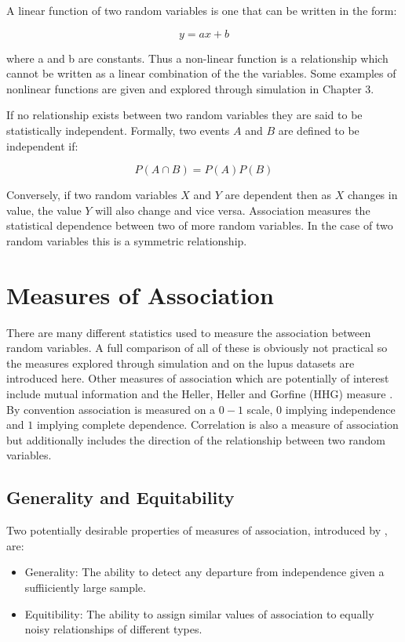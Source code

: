 \documentclass[a4paper, 12pt]{report}
\begin{document}
A linear function of two random variables is one that can be written in the form:

\[
y = ax + b
\]

where a and b are constants. Thus a non-linear function is a relationship which cannot be written as a linear combination of the the variables. Some examples of nonlinear functions are given and explored through simulation in Chapter 3.

If no relationship exists between two random variables they are said to be statistically independent. Formally, two events $A$ and $B$ are defined to be independent if:

\[
P(A \cap B) = P(A)P(B)
\]
 
Conversely, if two random variables $X$ and $Y$ are dependent then as $X$ changes in value, the value $Y$ will also change and vice versa. Association measures the statistical dependence between two of more random variables. In the case of two random variables this is a symmetric relationship.

\section{Measures of \gls{Association} }
There are many different statistics used to measure the association between random variables. A full comparison of all of these is obviously not practical so the measures explored through simulation and on the lupus datasets are introduced here. Other measures of association which are potentially of interest include mutual information and the Heller, Heller and Gorfine (HHG) measure \cite{HHG}. By convention association is measured on a $0-1$ scale, $0$ implying independence and $1$ implying complete dependence. \gls{Correlation} is also a measure of association but additionally includes the direction of the relationship between two random variables.

\subsection*{Generality and Equitability}
Two potentially desirable properties of measures of association, introduced by \citet{mic2011}, are:

\begin{itemize}
\item \gls{Generality}: The ability to detect any departure from independence given a suffiiciently large sample.
\item Equitibility: The ability to assign similar values of association to equally noisy relationships of different types.
\end{itemize}
\end{document}
